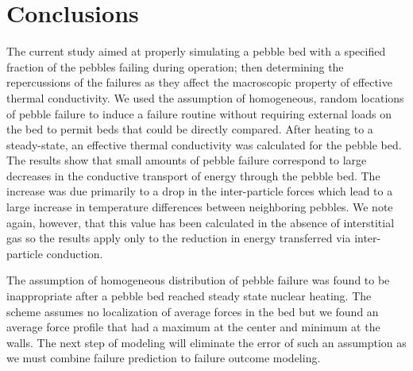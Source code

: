
\section{Conclusions}
\label{sec:dem-conclusions}
The current study aimed at properly simulating a pebble bed with a specified fraction of the pebbles failing during operation; then determining the repercussions of the failures as they affect the macroscopic property of effective thermal conductivity. We used the assumption of homogeneous, random locations of pebble failure to induce a failure routine without requiring external loads on the bed to permit beds that could be directly compared. After heating to a steady-state, an effective thermal conductivity was calculated for the pebble bed. The results show that small amounts of pebble failure correspond to large decreases in the conductive transport of energy through the pebble bed. The increase was due primarily to a drop in the inter-particle forces which lead to a large increase in temperature differences between neighboring pebbles. We note again, however, that this value has been calculated in the absence of interstitial gas so the results apply only to the reduction in energy transferred via inter-particle conduction.


The assumption of homogeneous distribution of pebble failure was found to be inappropriate after a pebble bed reached steady state nuclear heating. The scheme assumes no localization of average forces in the bed but we found an average force profile that had a maximum at the center and minimum at the walls. The next step of modeling will eliminate the error of such an assumption as we must combine failure prediction to failure outcome modeling. 


